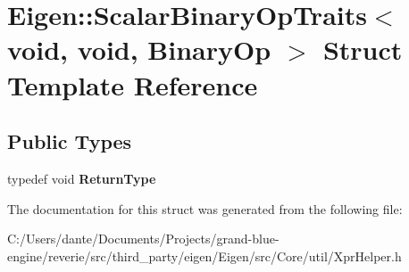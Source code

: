 \hypertarget{struct_eigen_1_1_scalar_binary_op_traits_3_01void_00_01void_00_01_binary_op_01_4}{}\section{Eigen\+::Scalar\+Binary\+Op\+Traits$<$ void, void, Binary\+Op $>$ Struct Template Reference}
\label{struct_eigen_1_1_scalar_binary_op_traits_3_01void_00_01void_00_01_binary_op_01_4}
\subsection*{Public Types}
\begin{DoxyCompactItemize}
\item 
\mbox{\label{struct_eigen_1_1_scalar_binary_op_traits_3_01void_00_01void_00_01_binary_op_01_4_ada3e378d2e165f502226f4512e180cb4}} 
typedef void {\bfseries Return\+Type}
\end{DoxyCompactItemize}


The documentation for this struct was generated from the following file\+:\begin{DoxyCompactItemize}
\item 
C\+:/\+Users/dante/\+Documents/\+Projects/grand-\/blue-\/engine/reverie/src/third\+\_\+party/eigen/\+Eigen/src/\+Core/util/Xpr\+Helper.\+h\end{DoxyCompactItemize}
